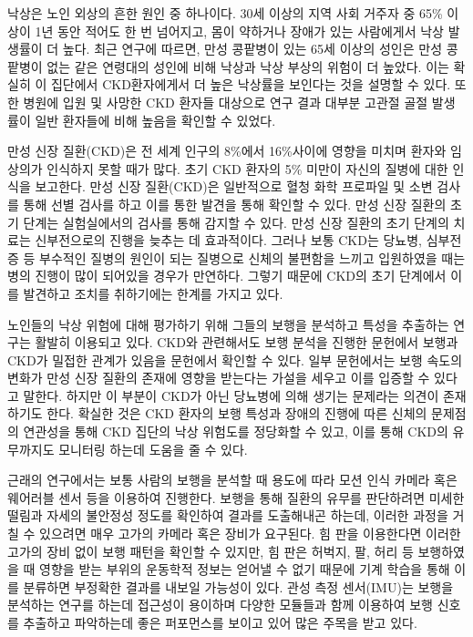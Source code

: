 \documentclass{article}
\begin{document}
낙상은 노인 외상의 흔한 원인 중 하나이다. 30세 이상의 지역 사회 거주자
중 65\% 이상이 1년 동안 적어도 한 번 넘어지고, 몸이 약하거나 장애가 있는
사람에게서 낙상 발생률이 더 높다. \cite{speechley_falls_1991} 최근 연구에
따르면, 만성 콩팥병이 있는 65세 이상의 성인은 만성 콩팥병이 없는 같은
연령대의 성인에 비해 낙상과 낙상 부상의 위험이 더 높았다.
\cite{kistler_falls_2018} 이는 확실히 이 집단에서 CKD환자에게서 더 높은
낙상률을 보인다는 것을 설명할 수 있다. 또한 병원에 입원 및 사망한 CKD
환자들 대상으로 연구 결과 대부분 고관절 골절 발생률이 일반 환자들에 비해
높음을 확인할 수 있었다.\cite{robertson_hip_2018}

만성 신장 질환(CKD)은 전 세계 인구의 8\%에서 16\%사이에 영향을 미치며
환자와 임상의가 인식하지 못할 때가 많다.\cite{jha_chronic_2013} 초기 CKD
환자의 5\% 미만이 자신의 질병에 대한 인식을
보고한다.\cite{chen_chronic_2019} 만성 신장 질환(CKD)은 일반적으로 혈청 화학
프로파일 및 소변 검사를 통해 선별 검사를 하고 이를 통한 발견을 통해
확인할 수 있다. 만성 신장 질환의 초기 단계는 실험실에서의 검사를 통해
감지할 수 있다. 만성 신장 질환의 초기 단계의 치료는 신부전으로의 진행을
늦추는 데 효과적이다.\cite{levey_kdoqi_2002} 그러나 보통 CKD는 당뇨병,
심부전증 등 부수적인 질병의 원인이 되는 질병으로 신체의 불편함을 느끼고
입원하였을 때는 병의 진행이 많이 되어있을 경우가 만연하다. 그렇기 때문에
CKD의 초기 단계에서 이를 발견하고 조치를 취하기에는 한계를 가지고 있다.

노인들의 낙상 위험에 대해 평가하기 위해 그들의 보행을 분석하고 특성을
추출하는 연구는 활발히 이용되고 있다.\cite{merlo_postural_2012} CKD와
관련해서도 보행 분석을 진행한 문헌에서 보행과 CKD가 밀접한 관계가 있음을
문헌에서 확인할 수 있다. 일부 문헌에서는 보행 속도의 변화가 만성 신장
질환의 존재에 영향을 받는다는 가설을 세우고 이를 입증할 수 있다고
말한다.\cite{bohannon_deficits_1995,painter_physical_2013,abe_determinants_2016} 하지만 이 부분이 CKD가 아닌 당뇨병에
의해 생기는 문제라는 의견이 존재하기도 한다.\cite{jin_comparison_2017} 확실한
것은 CKD 환자의 보행 특성과 장애의 진행에 따른 신체의 문제점의 연관성을
통해 CKD 집단의 낙상 위험도를 정당화할 수 있고, 이를 통해 CKD의
유무까지도 모니터링 하는데 도움을 줄 수 있다.

근래의 연구에서는 보통 사람의 보행을 분석할 때 용도에 따라 모션 인식
카메라 혹은 웨어러블 센서 등을 이용하여 진행한다.\cite{tao_gait_2012}
보행을 통해 질환의 유무를 판단하려면 미세한 떨림과 자세의 불안정성
정도를 확인하여 결과를 도출해내곤 하는데, 이러한 과정을 거칠 수 있으려면
매우 고가의 카메라 혹은 장비가 요구된다. 힘 판을 이용한다면 이러한
고가의 장비 없이 보행 패턴을 확인할 수 있지만, 힘 판은 허벅지, 팔, 허리
등 보행하였을 때 영향을 받는 부위의 운동학적 정보는 얻어낼 수 없기
때문에 기계 학습을 통해 이를 분류하면 부정확한 결과를 내보일 가능성이
있다.\cite{rashid_gait_2019} 관성 측정 센서(IMU)는 보행을 분석하는 연구를
하는데 접근성이 용이하며 다양한 모듈들과 함께 이용하여 보행 신호를
추출하고 파악하는데 좋은 퍼포먼스를 보이고 있어 많은 주목을 받고 있다.
\end{document}
